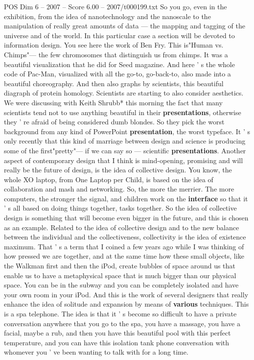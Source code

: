 \begin{textsample}{POS Dim 6 – 2007 – Score 6.00 – 2007/t000199.txt}
So you go, even in the exhibition, from the idea of nanotechnology and the nanoscale to the manipulation of really great amounts of data — the mapping and tagging of the universe and of the world.
In this particular case a section will be devoted to information design.
You see here the work of Ben Fry.
This is"Human vs.
Chimps"— the few chromosomes that distinguish us from chimps.
It was a beautiful visualization that he did for Seed magazine.
And here ' s the whole code of Pac-Man, visualized with all the go-to, go-back-to, also made into a beautiful choreography.
And then also graphs by scientists, this beautiful diagraph of protein homology.
Scientists are starting to also consider aesthetics.
We were discussing with Keith Shrubb* this morning the fact that many scientists tend not to use anything beautiful in their \textbf{presentations}, otherwise they ' re afraid of being considered dumb blondes.
So they pick the worst background from any kind of PowerPoint \textbf{presentation}, the worst typeface.
It ' s only recently that this kind of marriage between design and science is producing some of the first"pretty"— if we can say so — scientific \textbf{presentations}.
Another aspect of contemporary design that I think is mind-opening, promising and will really be the future of design, is the idea of collective design.
You know, the whole XO laptop, from One Laptop per Child, is based on the idea of collaboration and mash and networking.
So, the more the merrier.
The more computers, the stronger the signal, and children work on the \textbf{interface} so that it ' s all based on doing things together, tasks together.
So the idea of collective design is something that will become even bigger in the future, and this is chosen as an example.
Related to the idea of collective design and to the new balance between the individual and the collectiveness, collectivity is the idea of existence maximum.
That ' s a term that I coined a few years ago while I was thinking of how pressed we are together, and at the same time how these small objects, like the Walkman first and then the iPod, create bubbles of space around us that enable us to have a metaphysical space that is much bigger than our physical space.
You can be in the subway and you can be completely isolated and have your own room in your iPod.
And this is the work of several designers that really enhance the idea of solitude and expansion by means of \textbf{various} techniques.
This is a spa telephone.
The idea is that it ' s become so difficult to have a private conversation anywhere that you go to the spa, you have a massage, you have a facial, maybe a rub, and then you have this beautiful pool with this perfect temperature, and you can have this isolation tank phone conversation with whomever you ' ve been wanting to talk with for a long time.

\end{textsample}
